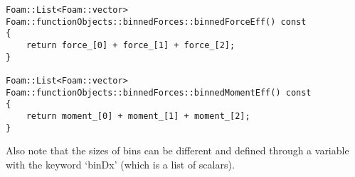 \begin{lstlisting}
Foam::List<Foam::vector> Foam::functionObjects::binnedForces::binnedForceEff() const
{
    return force_[0] + force_[1] + force_[2];
}

Foam::List<Foam::vector> Foam::functionObjects::binnedForces::binnedMomentEff() const
{
    return moment_[0] + moment_[1] + moment_[2];
}
\end{lstlisting}

\noindent  Also note that the sizes of bins can be different and defined through a variable with the keyword `binDx' (which is a list of scalars).



